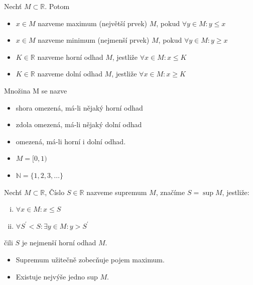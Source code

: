 \begin{definice}
  Nechť $M \subset \mathbb R$. Potom
  \begin{itemize}
    \item $x \in M$ nazveme maximum (největší prvek) $M$, pokud $\forall y \in M: y \leq x$
    \item $x \in M$ nazveme minimum (nejmenší prvek) $M$, pokud $\forall y \in M: y \geq x$
    \item $K \in \mathbb R$ nazveme horní odhad $M$, jestliže $\forall x \in M: x \leq K$
    \item $K \in \mathbb R$ nazveme dolní odhad $M$, jestliže $\forall x \in M: x \geq K$
  \end{itemize}
  Množina M se nazve
  \begin{itemize}
    \item shora omezená, má-li nějaký horní odhad
    \item zdola omezená, má-li nějaký dolní odhad
    \item omezená, má-li horní i dolní odhad.
  \end{itemize}
\end{definice}

\begin{priklad}
  \begin{itemize}
    \item $M = [0,1)$
    \item $\mathbb N = \{1, 2, 3, \dots\}$
  \end{itemize}
\end{priklad}

\begin{definice}[Supremum]\label{supremum}
  Nechť $M \subset \mathbb R$, Číslo $S \in \mathbb R$ nazveme supremum $M$, značíme $S = \sup M$, jestliže:
  \begin{enumerate}[i.]
    \item $\forall x \in M: x \leq S$
    \item $\forall S^\prime <S: \exists y \in M: y > S^\prime$
  \end{enumerate}
  čili $S$ je nejmenší horní odhad $M$.
\end{definice}

\begin{poznamka}
  \begin{itemize}
    \item Supremum užitečně zobecňuje pojem maximum.
    \item Existuje nejvýše jedno sup $M$.
  \end{itemize}
\end{poznamka}


